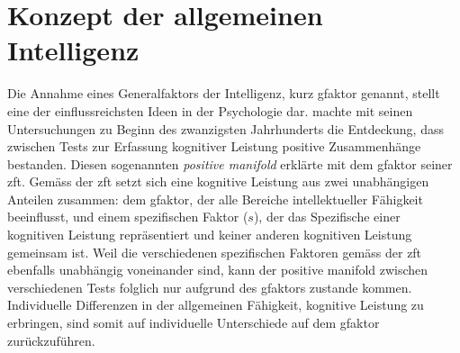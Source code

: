 \documentclass[11pt, twoside, a4paper]{book}		%
\begin{document}
\section{Konzept der allgemeinen Intelligenz}

Die Annahme eines Generalfaktors der Intelligenz, kurz \gls{gfaktor} genannt, stellt eine der einflussreichsten Ideen in der Psychologie dar. \citet{Spearman1904, Spearman1927} machte mit seinen Untersuchungen zu Beginn des zwanzigsten Jahrhunderts die Entdeckung, dass zwischen Tests zur Erfassung kognitiver Leistung positive Zusammenhänge bestanden. Diesen sogenannten \textit{positive man\-i\-fold} erklärte \citeauthor{Spearman1927} mit dem \gls{gfaktor} seiner \gls{zft}. Gemäss der \gls{zft} setzt sich eine kognitive Leistung aus zwei unabhängigen Anteilen zusammen: dem \gls{gfaktor}, der alle Bereiche intellektueller Fähigkeit beeinflusst, und einem spezifischen Faktor ($s$), der das Spezifische einer kognitiven Leistung repräsentiert und keiner anderen kognitiven Leistung gemeinsam ist. Weil die verschiedenen spezifischen Faktoren gemäss der \gls{zft} ebenfalls unabhängig voneinander sind, kann der positive man\-i\-fold zwischen verschiedenen Tests folglich nur aufgrund des \gls{gfaktor}s zustande kommen.
Individuelle Differenzen in der allgemeinen Fähigkeit, kognitive Leistung zu erbringen, sind somit auf individuelle Unterschiede auf dem \gls{gfaktor} zurückzuführen.
\end{document}
